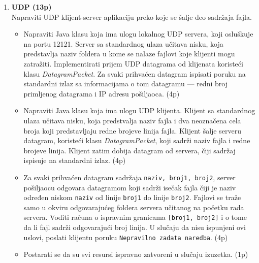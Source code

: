 \documentclass[]{article}
\begin{document}
\begin{enumerate}
\item \textbf{UDP (13p)}
\\Napraviti UDP klijent-server aplikaciju preko koje se šalje deo sadržaja fajla.
\begin{itemize}
  \item Napraviti Java klasu koja ima ulogu lokalnog UDP servera, koji oslu\v{s}kuje na portu 12121.
  Server sa standardnog ulaza učitava nisku, koja predstavlja naziv foldera u kome se nalaze fajlovi koje klijenti mogu zatra\v{z}iti.
  Implementirati prijem UDP datagrama od klijenata koriste\'c{}i klasu \textit{DatagramPacket}. Za svaki prihvaćen datagram ispisati poruku na standardni izlaz sa informacijama o tom datagramu --- redni broj primljenog datagrama i IP adresu po\v{s}iljaoca. \hfill (4p)
  \item Napraviti Java klasu koja ima ulogu UDP klijenta. Klijent sa standardnog ulaza učitava nisku, koja predstvalja naziv fajla i dva neoznačena cela broja koji predstavljaju redne brojeve linija fajla. Klijent šalje serveru datagram, koriste\'c{}i klasu \textit{DatagramPacket}, koji sadrži naziv fajla i redne brojeve linija. Klijent zatim dobija datagram od servera, \v{c}iji sadr\v{z}aj ispisuje na standardni izlaz. \hfill (4p)
  \item Za svaki prihvaćen datagram sadržaja \texttt{naziv, broj1, broj2}, server po\v{s}iljaocu odgovara datagramom koji sadrži ise\v{c}ak fajla čiji je naziv određen niskom \texttt{naziv} od linije \texttt{broj1} do linije \texttt{broj2}. Fajlovi se tra\v{z}e samo u okviru odgovarajućeg foldera servera u\v{c}itanog na po\v{c}etku rada servera. Voditi računa o ispravnim granicama \texttt{[broj1, broj2]} i o tome da li fajl sadrži odgovarajući broj linija. U slučaju da nisu ispunjeni ovi uslovi, poslati klijentu poruku \texttt{Nepravilno zadata naredba}.
  \hfill (4p)
  \item Postarati se da su svi resursi ispravno zatvoreni u slu\v{c}aju izuzetka. \hfill (1p)
\end{itemize}

\end{enumerate}
\end{document}
